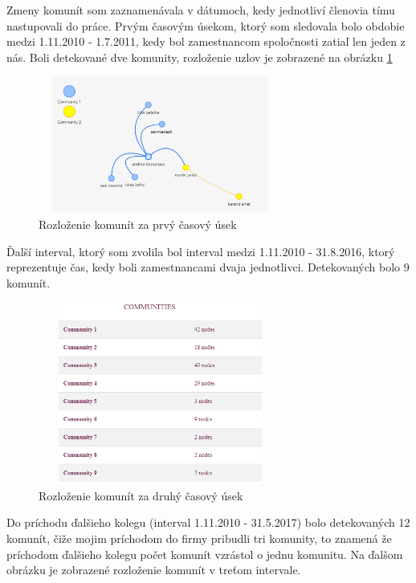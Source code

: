 \documentclass[slovak,master,public,dept460,male,cpdeclaration,oneside]{diploma}
\begin{document}
Zmeny komunít som zaznamenávala v dátumoch, kedy jednotliví členovia tímu nastupovali do práce. Prvým časovým úsekom, ktorý som sledovala bolo obdobie medzi 1.11.2010 - 1.7.2011, kedy bol zamestnancom spoločnosti zatiaľ len jeden z nás. Boli detekované dve komunity, rozloženie uzlov je zobrazené na obrázku \ref{team_communities_first}

\begin{figure}[H]
\centering
\includegraphics[width=8cm, height=4.5cm]{figures/team_communities_tab_first}
\caption{Rozloženie komunít za prvý časový úsek}
\label{team_communities_first}
\end{figure}


Ďalší interval, ktorý som zvolila bol interval medzi 1.11.2010 - 31.8.2016, ktorý reprezentuje čas, kedy boli zamestnancami dvaja jednotlivci. Detekovaných bolo 9 komunít. 


\begin{figure}[H]
\centering
\includegraphics[width=8cm, height=6cm]{figures/team_communities_tab_second}
\caption{Rozloženie komunít za druhý časový úsek}
\label{team_communities_second}
\end{figure}

Do príchodu ďalšieho kolegu (interval 1.11.2010 - 31.5.2017) bolo detekovaných 12 komunít, čiže mojim príchodom do firmy pribudli tri komunity, to znamená že príchodom ďalšieho kolegu počet komunít vzrástol o jednu komunitu. Na ďalšom obrázku je zobrazené rozloženie komunít v treťom intervale.
\end{document}
